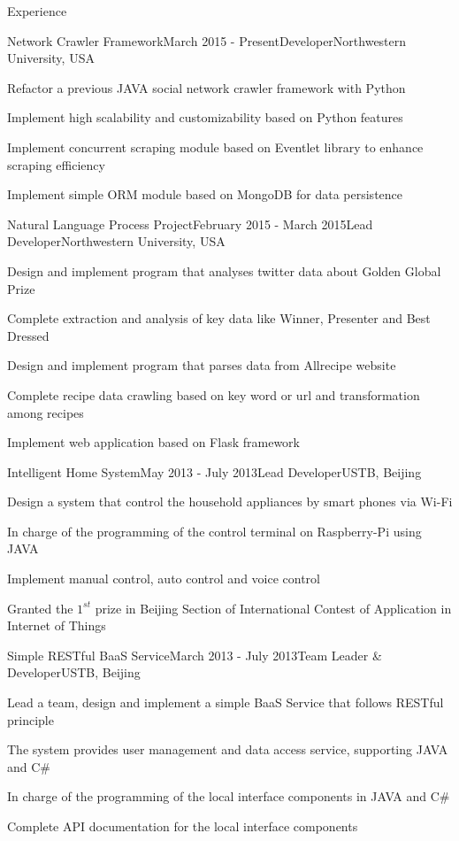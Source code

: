 \documentclass{resume} %
\begin{document}
\begin{rSection}{Experience}

\begin{rSubsection}{Network Crawler Framework}{March 2015 - Present}{Developer}{Northwestern University, USA}
\item Refactor a previous JAVA social network crawler framework with Python
\item Implement high scalability and customizability based on Python features
\item Implement concurrent scraping module based on Eventlet library to enhance scraping efficiency
\item Implement simple ORM module based on MongoDB for data persistence
\end{rSubsection}


\begin{rSubsection}{Natural Language Process Project}{February 2015 - March 2015}{Lead Developer}{Northwestern University, USA}
\item Design and implement program that analyses twitter data about Golden Global Prize
\item Complete extraction and analysis of key data like Winner, Presenter and Best Dressed
\item Design and implement program that parses data from Allrecipe website
\item Complete recipe data crawling based on key word or url and transformation among recipes
\item Implement web application based on Flask framework
\end{rSubsection}


\begin{rSubsection}{Intelligent Home System}{May 2013 - July 2013}{Lead Developer}{USTB, Beijing}
\item Design a system that control the household appliances by smart phones via Wi-Fi
\item In charge of the programming of the control terminal on Raspberry-Pi using JAVA
\item Implement manual control, auto control and voice control
\item Granted the $1^{st}$ prize in Beijing Section of International Contest of Application in Internet of Things
\end{rSubsection}


\begin{rSubsection}{Simple RESTful BaaS Service}{March 2013 - July 2013}{Team Leader \& Developer}{USTB, Beijing}
\item Lead a team, design and implement a simple BaaS Service that follows RESTful principle
\item The system provides user management and data access service, supporting JAVA and C\#
\item In charge of the programming of the local interface components in JAVA and C\#
\item Complete API documentation for the local interface components
\end{rSubsection}

\end{rSection}
\end{document}
